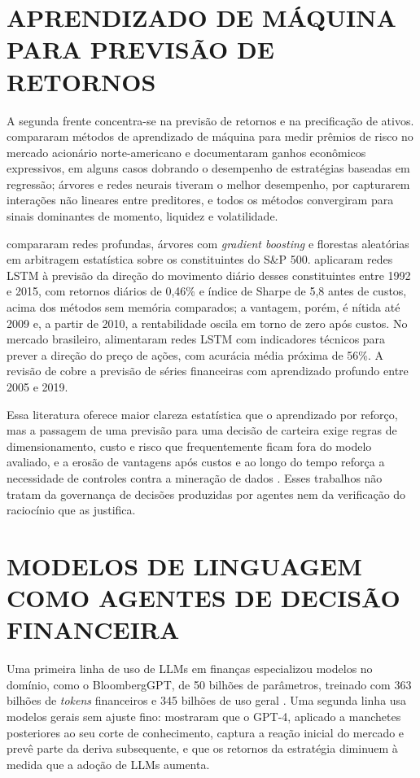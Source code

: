 \documentclass{eic-bcc-tcc}
\begin{document}
\section{APRENDIZADO DE MÁQUINA PARA PREVISÃO DE RETORNOS}

A segunda frente concentra-se na previsão de retornos e na precificação de ativos. \citet{Gu2020} compararam métodos de aprendizado de máquina para medir prêmios de risco no mercado acionário norte-americano e documentaram ganhos econômicos expressivos, em alguns casos dobrando o desempenho de estratégias baseadas em regressão; árvores e redes neurais tiveram o melhor desempenho, por capturarem interações não lineares entre preditores, e todos os métodos convergiram para sinais dominantes de momento, liquidez e volatilidade.

\citet{Krauss2017} compararam redes profundas, árvores com \textit{gradient boosting} e florestas aleatórias em arbitragem estatística sobre os constituintes do S\&P 500. \citet{Fischer2018} aplicaram redes LSTM à previsão da direção do movimento diário desses constituintes entre 1992 e 2015, com retornos diários de 0,46\% e índice de Sharpe de 5,8 antes de custos, acima dos métodos sem memória comparados; a vantagem, porém, é nítida até 2009 e, a partir de 2010, a rentabilidade oscila em torno de zero após custos. No mercado brasileiro, \citet{Nelson2017} alimentaram redes LSTM com indicadores técnicos para prever a direção do preço de ações, com acurácia média próxima de 56\%. A revisão de \citet{Sezer2020} cobre a previsão de séries financeiras com aprendizado profundo entre 2005 e 2019.

Essa literatura oferece maior clareza estatística que o aprendizado por reforço, mas a passagem de uma previsão para uma decisão de carteira exige regras de dimensionamento, custo e risco que frequentemente ficam fora do modelo avaliado, e a erosão de vantagens após custos e ao longo do tempo reforça a necessidade de controles contra a mineração de dados \citep{White2000, Hansen2005, LopezDePrado2018}. Esses trabalhos não tratam da governança de decisões produzidas por agentes nem da verificação do raciocínio que as justifica.

\section{MODELOS DE LINGUAGEM COMO AGENTES DE DECISÃO FINANCEIRA}

Uma primeira linha de uso de LLMs em finanças especializou modelos no domínio, como o BloombergGPT, de 50 bilhões de parâmetros, treinado com 363 bilhões de \textit{tokens} financeiros e 345 bilhões de uso geral \citep{Wu2023}. Uma segunda linha usa modelos gerais sem ajuste fino: \citet{LopezLira2023} mostraram que o GPT-4, aplicado a manchetes posteriores ao seu corte de conhecimento, captura a reação inicial do mercado e prevê parte da deriva subsequente, e que os retornos da estratégia diminuem à medida que a adoção de LLMs aumenta.
\end{document}
